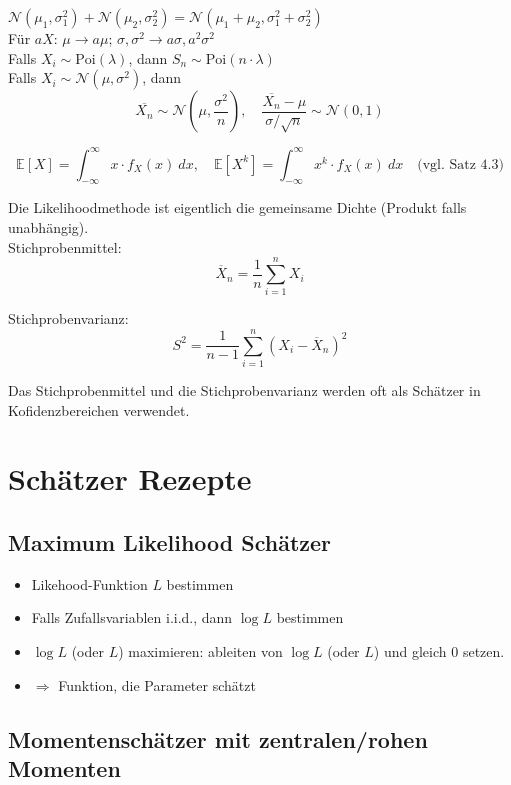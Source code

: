 $\mathcal{N}(\mu_1, \sigma_1^2) + \mathcal{N}(\mu_2, \sigma_2^2) = \mathcal{N}(\mu_1+\mu_2, \sigma_1^2 + \sigma_2^2)$\\

Für $aX$: $\mu \rightarrow a\mu$; $\sigma, \sigma^2 \rightarrow a\sigma, a^2\sigma^2 $\\

Falls $X_i \sim \text{Poi}(\lambda)$, dann $S_n \sim \text{Poi}(n \cdot \lambda)$\\


Falls $X_i \sim \mathcal{N}(\mu, \sigma^2)$, dann $$\overline{X_n} \sim \mathcal{N}(\mu, \frac{\sigma^2}{n}),\quad\frac{\overline{X_n}-\mu}{\sigma / \sqrt{n}} \sim \mathcal{N}(0, 1)$$

$$
	\mathbb{E}[X] = \int_{-\infty}^\infty x \cdot f_X(x)\ dx,\quad
	\mathbb{E}[X^k] = \int_{-\infty}^\infty x^k \cdot f_X(x)\ dx\quad
	\text{(vgl. Satz 4.3)}
$$

Die Likelihoodmethode ist eigentlich die gemeinsame Dichte (Produkt falls unabhängig).\\

Stichprobenmittel: $$\overline{X}_n = \frac{1}{n	}\sum_{i=1}^nX_i$$

Stichprobenvarianz: $$S^2 = \frac{1}{n-1}\sum^n_{i=1}\left(X_i-\overline{X}_n\right)^2$$

Das Stichprobenmittel und die Stichprobenvarianz werden oft als Schätzer in Kofidenzbereichen verwendet.\\

\section{Schätzer Rezepte}

\subsection{Maximum Likelihood Schätzer}

\begin{itemize}
	\item Likehood-Funktion $L$ bestimmen
	\item Falls Zufallsvariablen i.i.d., dann $\log L$ bestimmen
	\item $\log L$ (oder $L$) maximieren: ableiten von $\log L$ (oder $L$) und gleich $0$ setzen.
	\item $\Rightarrow$ Funktion, die Parameter schätzt
\end{itemize}

\subsection{Momentenschätzer mit zentralen/rohen Momenten}

